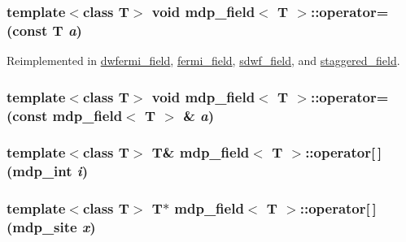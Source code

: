 \label{classmdp__field_a3d66759cffa9ddbb3d158551247e738f}
\hypertarget{classmdp__field_a24364bce6444668661a0688632af87ec}{
\subsubsection[{operator=}]{\setlength{\rightskip}{0pt plus 5cm}template$<$class T$>$ void {\bf mdp\_\-field}$<$ T $>$::operator= (const T {\em a})}}
\label{classmdp__field_a24364bce6444668661a0688632af87ec}


Reimplemented in \hyperlink{classdwfermi__field_a80684935337a1c336bd81379787ba9f4}{dwfermi\_\-field}, \hyperlink{classfermi__field_a1fb7ce7e54f45a334ee55dc7250aba89}{fermi\_\-field}, \hyperlink{classsdwf__field_ac9bbccf6442b9f1a1a07b18fd2fe442c}{sdwf\_\-field}, and \hyperlink{classstaggered__field_ac3fee1898eaa4198744c5bc0cc969e2e}{staggered\_\-field}.\hypertarget{classmdp__field_a3fd348984e7f37a5d85e18bb12212017}{
\subsubsection[{operator=}]{\setlength{\rightskip}{0pt plus 5cm}template$<$class T$>$ void {\bf mdp\_\-field}$<$ T $>$::operator= (const {\bf mdp\_\-field}$<$ T $>$ \& {\em a})}}
\label{classmdp__field_a3fd348984e7f37a5d85e18bb12212017}
\hypertarget{classmdp__field_a97c56a74600b0d408ec24a161c4e8643}{
\subsubsection[{operator[]}]{\setlength{\rightskip}{0pt plus 5cm}template$<$class T$>$ T\& {\bf mdp\_\-field}$<$ T $>$::operator\mbox{[}$\,$\mbox{]} ({\bf mdp\_\-int} {\em i})}}
\label{classmdp__field_a97c56a74600b0d408ec24a161c4e8643}
\hypertarget{classmdp__field_a7dab126ffc90476401048cdf747077ef}{
\subsubsection[{operator[]}]{\setlength{\rightskip}{0pt plus 5cm}template$<$class T$>$ T$\ast$ {\bf mdp\_\-field}$<$ T $>$::operator\mbox{[}$\,$\mbox{]} ({\bf mdp\_\-site} {\em x})}}
\label{classmdp__field_a7dab126ffc90476401048cdf747077ef}



